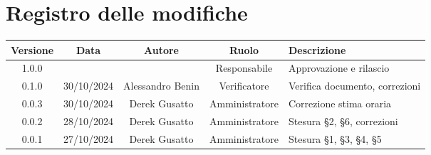 
\section*{Registro delle modifiche}
\begin{table}[H]
    \begin{tabular}{|c|c|c|c|p{4cm}|}
        \hline
         \textbf{Versione} &  \textbf{Data} &  \textbf{Autore} &  \textbf{Ruolo} & \textbf{Descrizione} \\
          \hline
          1.0.0&  &  & Responsabile & Approvazione e rilascio\\
          \hline
          0.1.0&  30/10/2024& Alessandro Benin & Verificatore & Verifica documento, correzioni \\
          \hline
          0.0.3&  30/10/2024&Derek Gusatto  & Amministratore &  Correzione stima oraria\\
          \hline
          0.0.2&  28/10/2024&Derek Gusatto  & Amministratore &  Stesura §2, §6, correzioni\\
          \hline
          0.0.1&  27/10/2024&Derek Gusatto  & Amministratore &  Stesura §1, §3, §4,  §5\\
          \hline
    \end{tabular}
\end{table}